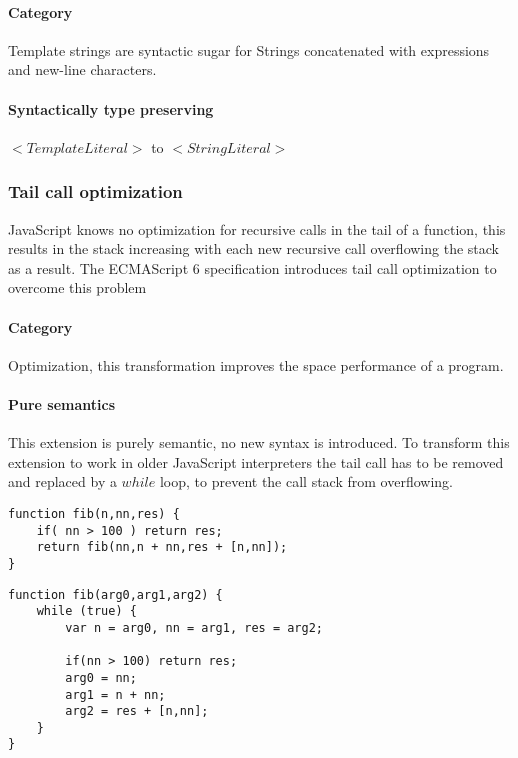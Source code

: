 \documentclass[10pt,a4paper]{article}
\begin{document}
\paragraph{Category}
Template strings are syntactic sugar for Strings concatenated with expressions and new-line characters.

\paragraph{Syntactically type preserving}
$<TemplateLiteral>$ to $<StringLiteral>$

\subsubsection{Tail call optimization}
JavaScript knows no optimization for recursive calls in the tail of a function, this results in the stack increasing with each new recursive call overflowing the stack as a result.  The ECMAScript 6 specification introduces tail call optimization to overcome this problem\cite[14.6]{SpecJS}

\paragraph{Category}
Optimization, this transformation improves the space performance of a program.

\paragraph{Pure semantics}
This extension is purely semantic, no new syntax is introduced. To transform this extension to work in older JavaScript interpreters the tail call has to be removed and replaced by a $while$ loop, to prevent the call stack from overflowing.

\begin{lstlisting}[caption={Function with tail recursion},label={lst:tail-call}]
function fib(n,nn,res) {
	if( nn > 100 ) return res;
	return fib(nn,n + nn,res + [n,nn]);
}
\end{lstlisting}

\begin{lstlisting}[caption={Semantically identical function, without tail recursion},label={lst:transformed-tail-call}]
function fib(arg0,arg1,arg2) {
	while (true) {
		var n = arg0, nn = arg1, res = arg2;

		if(nn > 100) return res;
		arg0 = nn;
		arg1 = n + nn;
		arg2 = res + [n,nn];
	}
}
\end{lstlisting}
\end{document}
